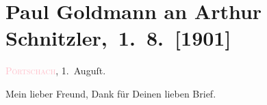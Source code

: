 

\renewcommand{\erwaehntePersonen}{Personen: Olga Schnitzler, Elisabeth Steinrück}
\renewcommand{\erwaehnteOrte}{Orte: Dolomiten, Lago di Garda, Pörtschach, Vahrn, Valle d’Ampezzo, Wien}
\renewcommand{\erwaehnteWerke}{}
\section[ Paul Goldmann an Arthur Schnitzler, 1. 8. {[}1901{]}]{Paul Goldmann an Arthur Schnitzler, 1. 8. {[}1901{]}}
\nopagebreak{}
\rehead{ }\normalsize\beginnumbering{}
\toendnotes[C]{\smallbreak\pagebreak[2]}
\toendnotes[C]{\smallbreak}
\pstart
           \raggedleft{}{\pb}\textsc{\textcolor{pink}{Pörtschach}{}\ledrightnote{\textcolor{pink}{Pörtschach}}}, 1. Auguſt.\pend
           
\pstart\center{}Mein lieber Freund,\pend
\pstart
           Dank für Deinen lieben Brief.\pend
           
